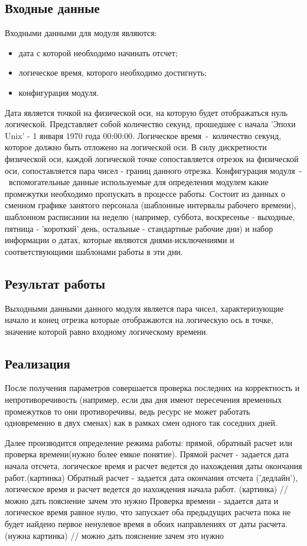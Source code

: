 \subsection{Входные данные}
Входными данными для модуля являются:
\begin{itemize}
	\item дата с которой необходимо начинать отсчет;
	\item логическое время, которого необходимо достигнуть;
	\item конфигурация модуля.
\end{itemize}
Дата является точкой на физической оси, на которую будет отображаться нуль логической. Представляет собой количество секунд, прошедшее с начала 'Эпохи Unix' - 1 января 1970 года 00:00:00.
Логическое время~-~количество секунд, которое должно быть отложено на логической оси. В силу дискретности физической оси, каждой логической точке сопоставляется отрезок на физической оси, сопоставляется пара чисел - границ данного отрезка.
Конфигурация модуля~-~вспомогательные данные используемые для определения модулем какие промежутки необходимо пропускать в процессе работы. Состоит из данных о сменном графике занятого персонала (шаблонные интервалы рабочего времени), шаблонном расписании на неделю (например, суббота, воскресенье - выходные, пятница - 'короткий' день, остальные - стандартные рабочие дни) и набор информации о датах, которые являются днями-исключениями и соответствующими шаблонами работы в эти дни.
\newline
\subsection{Результат работы}
Выходными данными данного модуля является пара чисел, характеризующие начало и конец отрезка которые отображаются на логическую ось в точке, значение которой равно входному логическому времени.

\subsection{Реализация}
После получения параметров совершается проверка последних на корректность и непротиворечивость (например, если два дня имеют пересечения временных промежутков то они противоречивы, ведь ресурс не может работать одновременно в двух сменах) как в рамках смен одного так соседних дней.

Далее производится определение режима работы: прямой, обратный расчет или проверка времени(нужно более емкое понятие).
Прямой расчет - задается дата начала отсчета, логическое время и расчет ведется до нахождения даты окончания работ.(картинка)
Обратный расчет - задается дата окончания отсчета ('дедлайн'), логическое время и расчет ведется до нахождения начала работ. (картинка) // можно дать пояснение зачем это нужно
Проверка времени - задается дата и логическое время равное нулю, что запускает оба предыдущих расчета пока не будет найдено первое ненулевое время в обоих направлениях от даты расчета. (нужна картинка) 
// можно дать пояснение зачем это нужно

